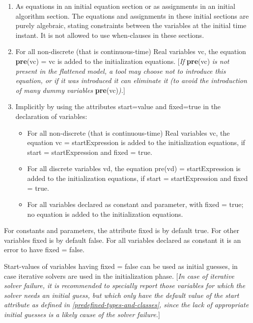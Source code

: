 \begin{enumerate}
\item
  As equations in an initial equation section or as assignments in an
  initial algorithm section. The equations and assignments in these
  initial sections are purely algebraic, stating constraints between the
  variables at the initial time instant. It is not allowed to use
  when-clauses in these sections.
\item
  For all non-discrete (that is continuous-time) Real variables vc, the
  equation \textbf{pre}(vc) = vc is added to the initialization
  equations. {[}\emph{If} \textbf{pre}(vc) \emph{is not present in the
  flattened model, a tool may choose not to introduce this equation, or
  if it was introduced it can eliminate it (to avoid the introduction of
  many dummy variables} \textbf{pre}(vc)\emph{).}{]}
\item
  Implicitly by using the attributes start=value and fixed=true in the
  declaration of variables:
\begin{itemize}
\item
  For all non-discrete (that is continuous-time) Real variables vc, the
  equation vc = startExpression is added to the initialization
  equations, if start = startExpression and fixed = true.
\item
  For all discrete variables vd, the equation pre(vd) = startExpression
  is added to the initialization equations, if start = startExpression
  and fixed = true.
\item
  For all variables declared as constant and parameter, with fixed =
  true; no equation is added to the initialization equations.
\end{itemize}
\end{enumerate}

For constants and parameters, the attribute fixed is by default true.
For other variables fixed is by default false. For all variables
declared as constant it is an error to have fixed = false.

Start-values of variables having fixed = false can be used as initial
guesses, in case iterative solvers are used in the initialization phase.
{[}\emph{In case of iterative solver failure, it is recommended to
specially report those variables for which the solver needs an initial
guess, but which only have the default value of the start attribute as
defined in \autoref{predefined-types-and-classes}, since the lack of appropriate initial
guesses is a likely cause of the solver failure.}{]}

